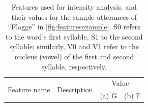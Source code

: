 	
\begin{table}%
		\centering
		\caption[Features used for intensity  analysis]{Features used for intensity analysis, and their values for the sample utterances of ``Flagge'' in \cref{fig:featuresexample}. 
		S0 refers to the word's first syllable, S1 to the second syllable; similarly, V0 and V1 refer to the nucleus (vowel) of the first and second syllable, respectively.
		}	
		
		
%		
%	
%	
%	
%		
	\begin{tabularx}{\textwidth}%
		{lXrr}
	\toprule
	\multirow{2}{*}{Feature name} 
					& \multirow{2}{*}{Description}
										& \multicolumn{2}{c}{Value} \\	
				  	&							&  (a) G		& (b) F			\\
	\midrule
	

\end{tabularx}
\end{table}

